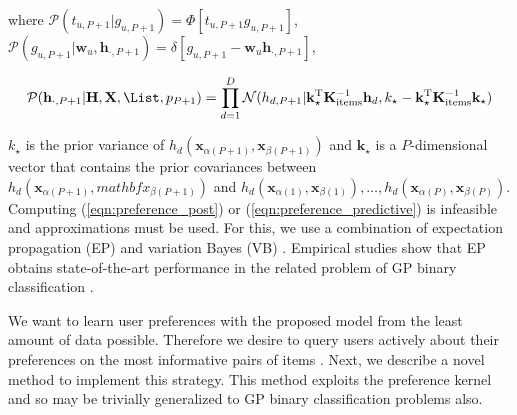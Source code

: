 where $\mathcal{P}(t_{u,P+1}|g_{u,P+1})=\Phi[t_{u,P+1}g_{u,P+1}]$, $\mathcal{P}(g_{u,P+1}|\mathbf{w}_u,\mathbf{h}_{\cdot,P+1})=\delta[ g_{u,P+1} - \mathbf{w}_u \mathbf{h}_{\cdot,P+1}]$,

\begin{equation}
	\mathcal{P}(\mathbf{h}_{\cdot,P+1}|\mathbf{H},\mathbf{X},\List,p_{P+1})
	=\prod_{d=1}^D \mathcal{N}(h_{d,P+1}|\mathbf{k}_\star^\text{T} \mathbf{K}^{-1}_\text{items} \mathbf{h}_d, k_\star -
	\mathbf{k}_\star^\text{T}  \mathbf{K}^{-1}_\text{items} \mathbf{k}_\star)
	\label{eqn:preference_predictive}
\end{equation}

$k_\star$ is the prior variance of $h_d(\mathbf{x}_{\alpha(P+1)}, \mathbf{x}_{\beta(P+1)})$ and $\mathbf{k}_\star$ is a $P$-dimensional vector that contains the prior covariances between $h_d(\mathbf{x}_{\alpha(P+1)},  mathbf{x}_{\beta(P+1)})$ and $h_d(\mathbf{x}_{\alpha(1)}, \mathbf{x}_{\beta(1)}),\ldots,h_d(\mathbf{x}_{\alpha(P)}, \mathbf{x}_{\beta(P)})$. Computing (\ref{eqn:preference_post}) or (\ref{eqn:preference_predictive}) is infeasible and approximations must be used. For this, we use a combination of expectation propagation (EP) \cite{Minka2001} and variation Bayes (VB) \cite{Ghahramani2001}. Empirical studies show that EP obtains state-of-the-art performance  in the related problem of GP binary classification \cite{nickisch2008}.

We want to learn user preferences with the proposed model from the least amount of data possible. Therefore we desire to query users actively about their preferences on the most informative pairs of items \cite{brochu2007active}. Next, we describe a novel method to implement this strategy. This method exploits the preference kernel and so may be trivially generalized to GP binary classification problems also.

